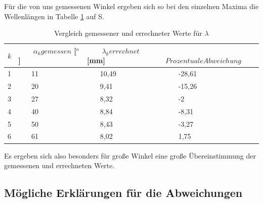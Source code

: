 Für die von uns gemessenen Winkel ergeben sich so bei den einzelnen Maxima die Wellenlängen in Tabelle \ref{tab_lambda_k} auf S. \pageref{tab_lambda_k}

\begin{table}
\centering
\begin{tabular}{l|l|l|l}
\(k\)	&~~~	\(\alpha_k gemessen\) [\(^o\)]	&~~~	\(\lambda_k errechnet\) [mm]	&~~~	\(Prozentuale Abweichung\)\\
\hline
1	&~~~	11	&~~~	10,49	&~~~	-28,61\\
2	&~~~	20	&~~~	9,41	&~~~	-15,26\\
3	&~~~	27	&~~~	8,32	&~~~	-2\\
4	&~~~	40	&~~~	8,84	&~~~	-8,31\\
5	&~~~	50	&~~~	8,43	&~~~	-3,27\\
6	&~~~	61	&~~~	8,02	&~~~	1,75\\
\end{tabular}
\caption{Vergleich gemessener und errechneter Werte für \(\lambda\)}
\label{tab_lambda_k}
\end{table}


Es ergeben sich also besonders für große Winkel eine große Übereinstimmung der gemessenen und errechneten Werte.


\subsection{Mögliche Erklärungen für die Abweichungen}
\label{kap_abw01}


